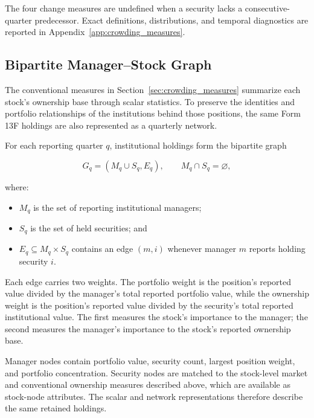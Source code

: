The four change measures are undefined when a security lacks a consecutive-quarter predecessor. Exact definitions, distributions, and temporal diagnostics are reported in Appendix~\ref{app:crowding_measures}.

\subsection{Bipartite Manager--Stock Graph}
\label{sec:bipartite_graph}

The conventional measures in Section~\ref{sec:crowding_measures} summarize each stock's ownership base through scalar statistics. To preserve the identities and portfolio relationships of the institutions behind those positions, the same Form 13F holdings are also represented as a quarterly network.

For each reporting quarter \(q\), institutional holdings form the bipartite graph

\begin{equation}
    G_q = \left(M_q \cup S_q, E_q\right),
    \qquad
    M_q \cap S_q = \varnothing,
    \label{eq:bipartite_graph}
\end{equation}

\noindent
where:

\begin{itemize}
    \item \(M_q\) is the set of reporting institutional managers;
    \item \(S_q\) is the set of held securities; and
    \item \(E_q \subseteq M_q \times S_q\) contains an edge \((m,i)\) whenever manager \(m\) reports holding security \(i\).
\end{itemize}

\noindent
Each edge carries two weights. The portfolio weight is the position's reported value divided by the manager's total reported portfolio value, while the ownership weight is the position's reported value divided by the security's total reported institutional value. The first measures the stock's importance to the manager; the second measures the manager's importance to the stock's reported ownership base.

Manager nodes contain portfolio value, security count, largest position weight, and portfolio concentration. Security nodes are matched to the stock-level market and conventional ownership measures described above, which are available as stock-node attributes. The scalar and network representations therefore describe the same retained holdings.

